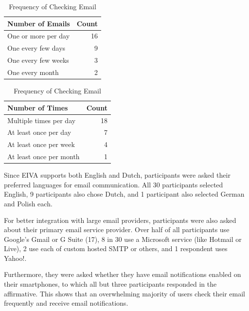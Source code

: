 \documentclass{article}
\begin{document}
\begin{table}[!htb]
	\begin{minipage}{.5\linewidth}
		\caption{Frequency of Emails Sent}
		\centering
		\begin{tabular}{lr}
			\hline
			\textbf{Number of Emails} & \textbf{Count} \\
			\hline
			One or more per day       & 16             \\
			One every few days        & 9              \\
			One every few weeks       & 3              \\
			One every month           & 2              \\
			\hline
		\end{tabular}
	\end{minipage}%
	\hspace{.1cm}
	\begin{minipage}{.5\linewidth}
		\centering
		\caption{Frequency of Checking Email}
		\begin{tabular}{lr}
			\hline
			\textbf{Number of Times} & \textbf{Count} \\
			\hline
			Multiple times per day   & 18             \\
			At least once per day    & 7              \\
			At least once per week   & 4              \\
			At least once per month  & 1              \\
			\hline
		\end{tabular}
	\end{minipage} 
\end{table}

Since EIVA supports both English and Dutch, participants were asked their preferred languages for email communication. All 30 participants selected English, 9 participants also chose Dutch, and 1 participant also selected German and Polish each.

For better integration with large email providers, participants were also asked about their primary email service provider. Over half of all participants use Google's Gmail or G Suite (17), 8 in 30 use a Microsoft service (like Hotmail or Live), 2 use each of custom hosted SMTP or others, and 1 respondent uses Yahoo!.

Furthermore, they were asked whether they have email notifications enabled on their smartphones, to which all but three participants responded in the affirmative. This shows that an overwhelming majority of users check their email frequently and receive email notifications.
\end{document}
